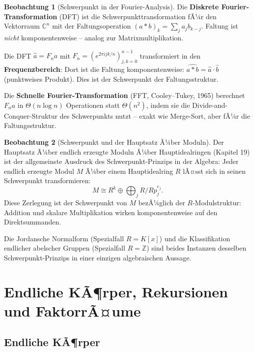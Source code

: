 ﻿\documentclass[a4paper,12pt]{report}
\theoremstyle{definition}
\newtheorem{beobachtung}{Beobachtung}
\begin{document}
\begin{beobachtung}[Schwerpunkt in der Fourier-Analysis]
    Die \textbf{Diskrete Fourier-Trans\-formation} (DFT) ist die
    Schwerpunkttransformation fÃ¼r den Vektorraum $\mathbb{C}^n$ mit
    der Faltungsoperation $(a * b)_k = \sum_j a_j b_{k-j}$.
    Faltung ist \emph{nicht} komponentenweise -- analog zur Matrixmultiplikation.

    Die DFT $\hat{a} = F_n a$ mit $F_n = (e^{2\pi i jk/n})_{j,k=0}^{n-1}$
    transformiert in den \textbf{Frequenzbereich}: Dort ist die Faltung
    komponentenweise: $\widehat{a * b} = \hat{a} \cdot \hat{b}$
    (punktweises Produkt). Dies ist der Schwerpunkt der Faltungsstruktur.

    Die \textbf{Schnelle Fourier-Transformation} (FFT, Cooley--Tukey, 1965)
    berechnet $F_n a$ in $\Theta(n \log n)$ Operationen statt $\Theta(n^2)$,
    indem sie die Divide-and-Conquer-Struktur des Schwerpunkts nutzt --
    exakt wie Merge-Sort, aber fÃ¼r die Faltungsstruktur.
\end{beobachtung}

\begin{beobachtung}[Schwerpunkt und der Hauptsatz Ã¼ber Moduln]
    Der Hauptsatz Ã¼ber endlich erzeugte Moduln Ã¼ber Hauptidealringen
    (Kapitel 19) ist der allgemeinste Ausdruck des Schwerpunkt-Prinzips
    in der Algebra: Jeder endlich erzeugte Modul $M$ Ã¼ber einem
    Hauptidealring $R$ lÃ¤sst sich in seinen Schwerpunkt transformieren:
    \[
        M \cong R^k \oplus \bigoplus_j R/Rp_j^{e_j}.
    \]
    Diese Zerlegung ist der Schwerpunkt von $M$ bezÃ¼glich der
    $R$-Modulstruktur: Addition und skalare Multiplikation wirken
    komponentenweise auf den Direktsummanden.

    Die Jordansche Normalform (Spezialfall $R = K[x]$) und die
    Klassifikation endlicher abelscher Gruppen (Spezialfall $R = \mathbb{Z}$)
    sind beides Instanzen desselben Schwerpunkt-Prinzips in einer
    einzigen algebraischen Aussage.
\end{beobachtung}

\chapter{Endliche KÃ¶rper, Rekursionen und FaktorrÃ¤ume}

\section{Endliche KÃ¶rper}
\end{document}
